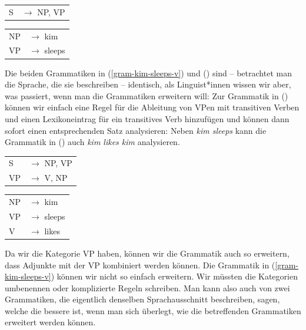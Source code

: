 \ea
\begin{tabular}[t]{@{}l@{ }l}       
{S}  & {$\to$ NP, VP}\\
\end{tabular}\hspace{2cm}%
\begin{tabular}[t]{@{}l@{ }l}
{NP} & {$\to$ kim}\\
{VP} & {$\to$ sleeps}\\
\end{tabular}
\z
Die beiden Grammatiken in (\ref{gram-kim-sleeps-v}) und () sind -- betrachtet man die Sprache, die sie beschreiben -- identisch,
als Linguist*innen wissen wir aber, was passiert, wenn man die Grammatiken erweitern will: Zur Grammatik
in () können wir einfach eine Regel für die Ableitung von VPen mit transitiven Verben und
einen Lexikoneintrag für ein transitives Verb hinzufügen und können dann sofort einen entsprechenden
Satz analysieren: Neben \emph{kim sleeps} kann die Grammatik in () auch \emph{kim likes kim} analysieren.
\ea
\begin{tabular}[t]{@{}l@{ }l}       
{S}  & {$\to$ NP, VP}\\
VP   & $\to$ V, NP\\
\end{tabular}\hspace{2cm}%
\begin{tabular}[t]{@{}l@{ }l}
{NP} & {$\to$ kim}\\
{VP} & {$\to$ sleeps}\\
V    & $\to$ likes\\
\end{tabular}
\z
Da wir die Kategorie VP haben, können wir die Grammatik auch so erweitern, dass Adjunkte
mit der VP kombiniert werden können. Die Grammatik in (\ref{gram-kim-sleeps-v}) können wir 
nicht so einfach erweitern. Wir müssten die Kategorien umbenennen oder komplizierte Regeln
schreiben. Man kann also auch von zwei Grammatiken, die eigentlich denselben Sprachausschnitt
beschreiben, sagen, welche die bessere ist, wenn man sich überlegt, wie die betreffenden
Grammatiken erweitert werden können.

